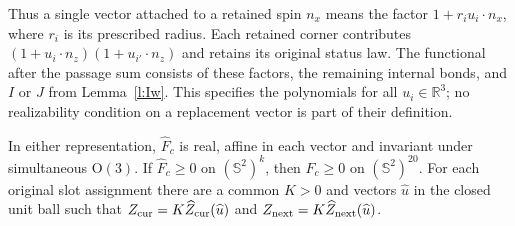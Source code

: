 Thus a single vector attached to a retained spin \(n_x\) means
the factor \(1+r_i u_i\cdot n_x\), where \(r_i\) is its prescribed
radius.  Each retained corner contributes
\((1+u_i\cdot n_z)(1+u_{i'}\cdot n_z)\) and retains its original
status law.  The functional after the passage sum consists of
these factors, the remaining internal bonds, and \(I\) or \(J\)
from Lemma~\ref{l:Iw}.  This specifies the polynomials for all
\(u_i\in\mathbb R^3\); no realizability condition on a replacement
vector is part of their definition.

\begin{corollary}\label{c:reduce}
In either representation, \(\widehat F_c\) is real, affine in
each vector and invariant under simultaneous \(\mathrm O(3)\).
If \(\widehat F_c\ge0\) on \((\mathbb S^2)^k\), then
\(F_c\ge0\) on \((\mathbb S^2)^{20}\).
For each original slot assignment there are a common \(K>0\)
and vectors \(\widehat u\) in the closed unit ball such that
\(Z_{\rm cur}=K\widehat Z_{\rm cur}(\widehat u)\) and
\(Z_{\rm next}=K\widehat Z_{\rm next}(\widehat u)\).
\end{corollary}

